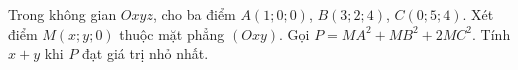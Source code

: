 \begin{ex}
Trong không gian $Oxyz$, cho ba điểm $A(1;0;0)$, $B(3;2;4)$, $C(0;5;4)$. Xét điểm $M(x;y;0)$ thuộc mặt phẳng $(Oxy)$. Gọi $P=MA^2+MB^2+2MC^2$. Tính $x+y$ khi $P$ đạt giá trị nhỏ nhất.
\end{ex}
